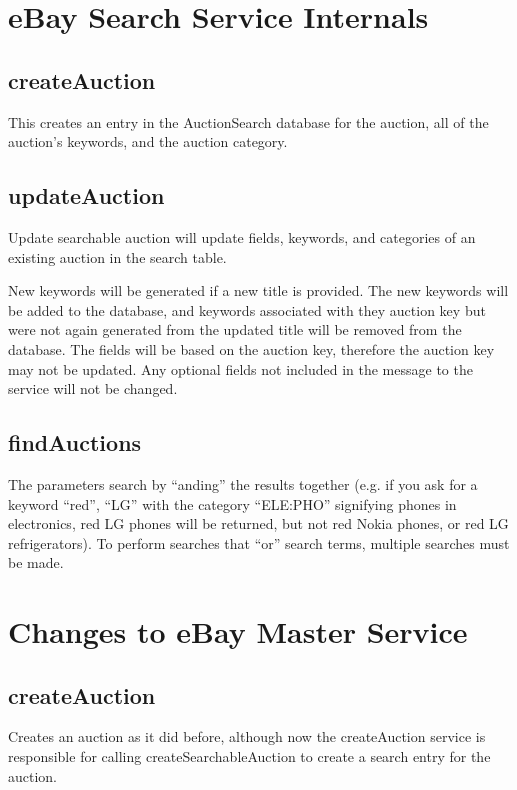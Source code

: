 \documentclass[12pt,a4paper]{article}
\begin{document}
\pagebreak
\section{eBay Search Service Internals}
\subsection{createAuction}
This creates an entry in the AuctionSearch database for the auction, all of the
auction's keywords, and the auction category.

\subsection{updateAuction}
Update searchable auction will update fields, keywords, and categories of an
existing auction in the search table.

New keywords will be generated if a new title is provided. The new keywords will be added to the database, and keywords
associated with they auction key but were not again generated from the updated
title will be removed from the database. The fields will be based on the
auction key, therefore the auction key may not be updated. Any optional fields
not included in the message to the service will not be changed.

\subsection{findAuctions}
The parameters search by ``anding'' the results together (e.g. if you ask for a
keyword ``red'', ``LG'' with the category ``ELE:PHO'' signifying phones in
electronics, red LG phones will be returned, but not red Nokia phones, or red
LG refrigerators). To perform searches that ``or'' search terms, multiple
searches must be made.

\pagebreak
\section{Changes to eBay Master Service}

\subsection{createAuction}

Creates an auction as it did before, although now the createAuction service is
responsible for calling createSearchableAuction to create a search entry for
the auction.
\end{document}
